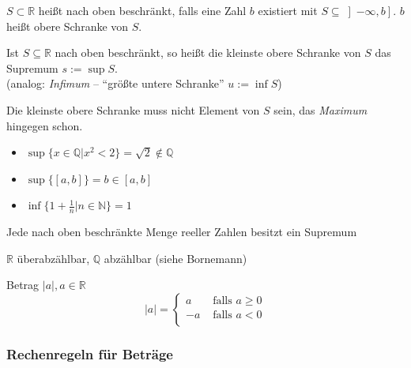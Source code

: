 \begin{definition}
$S \subset \mathbb{R}$ heißt nach oben beschränkt, falls eine Zahl $b$ existiert mit $S\subseteq \left]-\infty,b\right]$. $b$ heißt obere Schranke von $S$.
\end{definition}

\begin{definition}[Supremum]
Ist $S \subseteq \mathbb{R}$ nach oben beschränkt, so heißt die kleinste obere Schranke von $S$ das Supremum $s:=\sup S$.\\
(analog: \emph{Infimum} -- ``größte untere Schranke'' $u := \inf S$)
\end{definition}

\begin{note}Die kleinste obere Schranke muss nicht Element von $S$ sein, das \emph{Maximum} hingegen schon.\end{note}

\begin{example}\flush
  \begin{itemize}
    \item $\sup \{x \in \mathbb{Q} | x^2 < 2 \} = \sqrt{2} \notin \mathbb{Q}$
    \item $\sup \{[a,b]\} = b \in [a,b]$
    \item $\inf \{ 1+\frac{1}{n}|n\in \mathbb{N}\} = 1$
  \end{itemize}
\end{example}

\begin{theorem}
Jede nach oben beschränkte Menge reeller Zahlen besitzt ein Supremum
\end{theorem}

\begin{note}
$\mathbb{R}$ überabzählbar, $\mathbb{Q}$ abzählbar (siehe Bornemann)
\end{note}

\begin{definition}[Betrag]
Betrag $|a|, a \in \mathbb{R}$\\
\[ |a| = 
\begin{cases}
 a & \text{ falls } a \geq 0 \\
 -a & \text{ falls } a < 0 \\
\end{cases}
\]
\end{definition}

\subsubsection*{Rechenregeln für Beträge}

